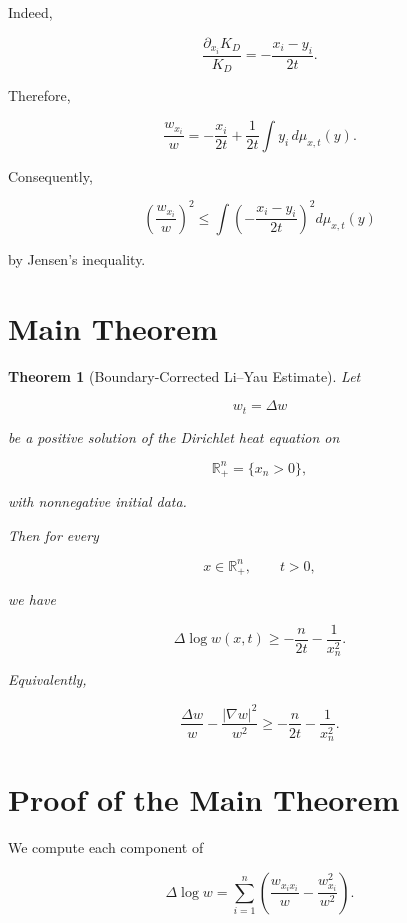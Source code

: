\documentclass[11pt]{amsart}
\newtheorem{theorem}{Theorem}[section]
\theoremstyle{definition}
\theoremstyle{remark}
\begin{document}
Indeed,

\[
\frac{\partial_{x_i}K_D}{K_D}
=
-\frac{x_i-y_i}{2t}.
\]

Therefore,

\[
\frac{w_{x_i}}w
=
-\frac{x_i}{2t}
+
\frac1{2t}
\int y_i\,d\mu_{x,t}(y).
\]


Consequently,

\[
\left(
\frac{w_{x_i}}w
\right)^2
\leq
\int
\left(
-\frac{x_i-y_i}{2t}
\right)^2
d\mu_{x,t}(y)
\]

by Jensen's inequality.



\section{Main Theorem}



\begin{theorem}[Boundary-Corrected Li--Yau Estimate]

Let

\[
w_t=\Delta w
\]

be a positive solution of the Dirichlet heat equation on

\[
\mathbb R^n_+
=
\{x_n>0\},
\]

with nonnegative initial data.

Then for every

\[
x\in\mathbb R^n_+,
\qquad
t>0,
\]

we have

\[
\boxed{
\Delta\log w(x,t)
\geq
-\frac n{2t}
-\frac1{x_n^2}
}.
\]

Equivalently,

\[
\boxed{
\frac{\Delta w}{w}
-
\frac{|\nabla w|^2}{w^2}
\geq
-\frac n{2t}
-\frac1{x_n^2}
}.
\]

\end{theorem}



\section{Proof of the Main Theorem}


We compute each component of

\[
\Delta\log w
=
\sum_{i=1}^{n}
\left(
\frac{w_{x_ix_i}}w
-
\frac{w_{x_i}^2}{w^2}
\right).
\]
\end{document}
